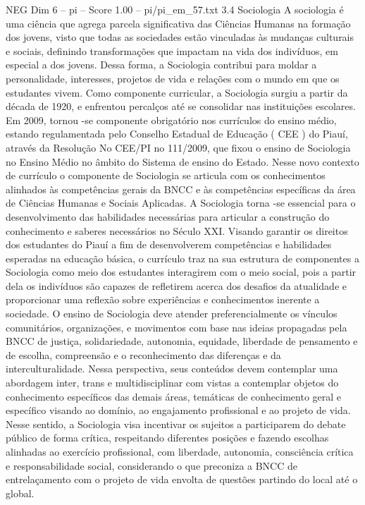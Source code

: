 \begin{textsample}{NEG Dim 6 – pi – Score 1.00 – pi/pi\_em\_57.txt}  \label{ex:f6_neg_097}
3.4 Sociologia A sociologia é uma ciência que agrega parcela significativa das Ciências Humanas na formação dos jovens, visto que todas as sociedades estão vinculadas às mudanças culturais e sociais, definindo transformações que impactam na vida dos indivíduos, em especial a dos jovens.
Dessa forma, a Sociologia contribui para moldar a personalidade, interesses, projetos de vida e relações com o mundo em que os estudantes vivem.
Como componente curricular, a Sociologia surgiu a partir da década de 1920, e enfrentou percalços até se consolidar nas instituições escolares.
Em 2009, tornou -se componente obrigatório nos currículos do ensino médio, estando regulamentada pelo Conselho Estadual de Educação ( CEE ) do Piauí, através da Resolução No CEE/PI no 111/2009, que fixou o ensino de Sociologia no Ensino Médio no âmbito do Sistema de ensino do Estado.
Nesse novo contexto de currículo o componente de Sociologia se articula com os conhecimentos alinhados às competências gerais da BNCC e às competências específicas da área de Ciências Humanas e Sociais Aplicadas.
A Sociologia torna -se essencial para o desenvolvimento das habilidades necessárias para articular a construção do conhecimento e saberes necessários no Século XXI.
Visando garantir os direitos dos estudantes do Piauí a fim de desenvolverem competências e habilidades esperadas na educação básica, o currículo traz na sua estrutura de componentes a Sociologia como meio dos estudantes interagirem com o meio social, pois a partir dela os indivíduos são capazes de refletirem acerca dos desafios da atualidade e proporcionar uma reflexão sobre experiências e conhecimentos inerente a sociedade.
O ensino de Sociologia deve atender preferencialmente os vínculos comunitários, organizações, e movimentos com base nas ideias propagadas pela BNCC de justiça, solidariedade, autonomia, equidade, liberdade de pensamento e de escolha, compreensão e o reconhecimento das diferenças e da interculturalidade.
Nessa perspectiva, seus conteúdos devem contemplar uma abordagem inter, trans e multidisciplinar com vistas a contemplar objetos do conhecimento específicos das demais áreas, temáticas de conhecimento geral e específico visando ao domínio, ao engajamento profissional e ao projeto de vida.
Nesse sentido, a Sociologia visa incentivar os sujeitos a participarem do debate público de forma crítica, respeitando diferentes posições e fazendo escolhas alinhadas ao exercício profissional, com liberdade, autonomia, consciência crítica e responsabilidade social, considerando o que preconiza a BNCC de entrelaçamento com o projeto de vida envolta de questões partindo do local até o global.

\end{textsample}
